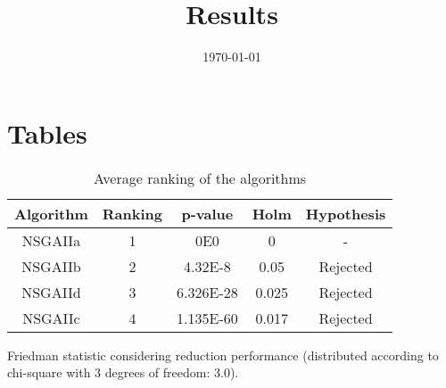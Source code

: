 \documentclass{article}
\title{Results}
\author{}
\date{\today}
\begin{document}
\oddsidemargin 0in \topmargin 0in\maketitle

\section{Tables}
\begin{table}[!htp]
\centering
\begin{tabular}{c|c|c|c|c}
Algorithm&Ranking&p-value&Holm&Hypothesis\\
\hline
NSGAIIa & 1 & 0E0 & 0 & -\\
NSGAIIb & 2 & 4.32E-8 & 0.05 & Rejected\\
NSGAIId & 3 & 6.326E-28 & 0.025 & Rejected\\
NSGAIIc & 4 & 1.135E-60 & 0.017 & Rejected\\
\end{tabular}
\caption{Average ranking of the algorithms}
\end{table}


Friedman statistic considering reduction performance (distributed according to chi-square with 3 degrees of freedom: 3.0).
\end{document}
